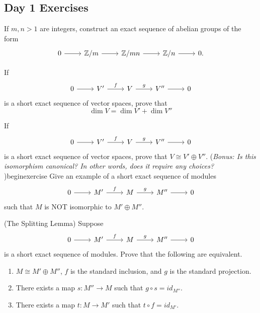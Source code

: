 \subsection{Day 1 Exercises}
\begin{exercise}{}{} If $m,n>1$ are integers, construct an exact sequence of abelian groups of the form
\[\begin{tikzcd}
0 \ar[r] & \mathbb{Z}/m \ar[r] & \mathbb{Z}/mn \ar[r] & \mathbb{Z}/n \ar[r] & 0.
\end{tikzcd} \]
\end{exercise}
\begin{exercise}{}{} 
    If 
    \[ \begin{tikzcd}
        0 \ar[r] & V' \ar[r,"f"] & V \ar[r,"g"] & V'' \ar[r] & 0
    \end{tikzcd}\]
    is a short exact sequence of vector spaces, prove that 
    \[
    \dim V = \dim V' + \dim V''
    \]
\end{exercise}
\begin{exercise}{}{} 
    If 
    \[ \begin{tikzcd}
        0 \ar[r] & V' \ar[r,"f"] & V \ar[r,"g"] & V'' \ar[r] & 0
    \end{tikzcd}\]
    is a short exact sequence of vector spaces, prove that $V \cong V' \oplus V''$. ({\it Bonus: Is this isomorphism canonical? In other words, does it require any choices? })begin{exercise}{}{} 
    Give an example of a short exact sequence of modules
    \[ \begin{tikzcd}
        0 \ar[r] & M' \ar[r,"f"] & M \ar[r,"g"] & M'' \ar[r] & 0
    \end{tikzcd}\]
    such that $M$ is NOT isomorphic to $M' \oplus M''$. 
\end{exercise}
\begin{exercise}{}{} (The Splitting Lemma)
    Suppose     
    \[ \begin{tikzcd}
        0 \ar[r] & M' \ar[r,"f"] & M \ar[r,"g"] & M'' \ar[r] & 0
    \end{tikzcd}\]
    is a short exact sequence of modules. Prove that the following are equivalent.
    \begin{enumerate}
        \item $M \cong M' \oplus M''$, $f$ is the standard inclusion, and $g$ is the standard projection.
        \item There exists a map $s:M'' \to M$ such that $g \circ s = id_{M''}$.
        \item There exists a map $t:M \to M'$ such that $t \circ f = id_{M'}$.
    \end{enumerate}
\end{exercise}
